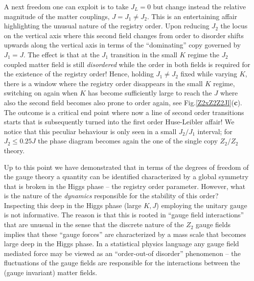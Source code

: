A next freedom one can exploit is to take $J_L =0$ but change instead the relative magnitude of the matter couplings, $J = J_1 \neq J_2$.  This is an entertaining affair highlighting the unusual nature of the registry order. Upon reducing $J_2$ the locus on the vertical axis where this second field changes from order to disorder shifts upwards along the vertical axis in terms of the ``dominating'' copy governed by $J_1=J$. The effect is that at the $J_1$ transition in the small $K$ regime the $J_2$ coupled matter field is still {\em disordered} 
while the order in both fields is required for the existence of the registry order! Hence, holding $J_1\neq J_2$ fixed while varying $K$, there is a window where the registry order disappears in the small $K$ regime, switching on again when $K$ has become sufficiently large to reach the $J$ where also the second field becomes also prone to order again, see Fig.\ref{Z2xZ2Z2Jl}(\textbf{c}). The outcome is a critical end point where now a line of second order transitions starts that is subsequently turned into the first order Huse-Leibler affair! We notice that this peculiar behaviour is only seen in a small $J_2/J_1$ interval; for $J_2 \le 0.25 J$ the phase diagram becomes again the one of the single copy $Z_2/Z_2$ theory.

\bigskip

Up to this point we have demonstrated that in terms of the degrees of freedom of the gauge theory a quantity can be identified characterized by a global symmetry that is broken in the Higgs phase -- the registry order parameter. However, what is the nature of the {\em dynamics} responsible for the stability of this order? Inspecting this deep in the Higgs phase (large $K,J$) employing the unitary gauge is not informative. The reason is that this is rooted in ``gauge field interactions'' that are unusual   in the sense that the discrete nature of the $Z_2$ gauge fields implies that these ``gauge forces'' are characterized by a mass scale that becomes large deep in the Higgs phase. In a statistical physics language any gauge field mediated force may be viewed as an ``order-out-of disorder'' phenomenon -- the fluctuations of the gauge fields are responsible for the interactions between the (gauge invariant) matter fields. 

